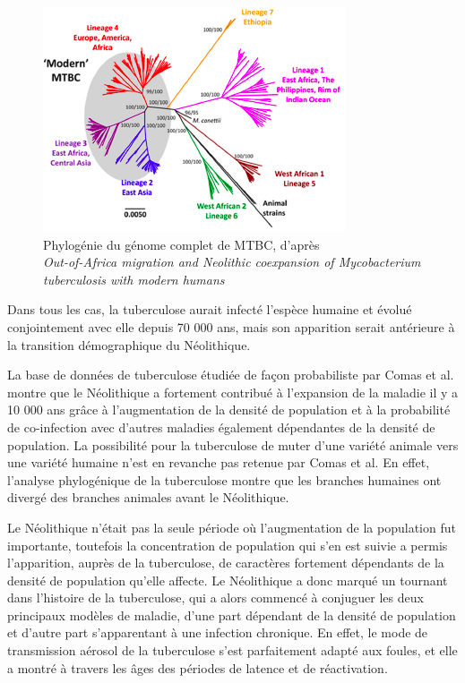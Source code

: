 \documentclass[twoside,a4paper,11pt,frenchb,openany]{report}
\begin{document}
\begin{figure}[h!]
\centering
\includegraphics[scale=0.7]{worldlignee.png}
\caption{Phylogénie du génome complet de MTBC, d'après\\ \textit{Out-of-Africa migration and Neolithic coexpansion of Mycobacterium\\tuberculosis with modern humans}}
\end{figure}


Dans tous les cas, la tuberculose aurait infecté l'espèce humaine et évolué conjointement avec elle depuis 70 000 ans, mais son apparition serait antérieure à la transition démographique du Néolithique.

La base de données de tuberculose étudiée de façon probabiliste par Comas et al.\cite{comas} montre que le Néolithique a fortement contribué à l'expansion de la maladie il y a 10 000 ans grâce à l'augmentation de la densité de population et à la probabilité de co-infection avec d'autres maladies également dépendantes de la densité de population. La possibilité pour la tuberculose de muter d'une variété animale vers une variété humaine n'est en revanche pas retenue par Comas et al. En effet, l'analyse phylogénique de la tuberculose montre que les branches humaines ont divergé des branches animales avant le Néolithique.

Le Néolithique n'était pas la seule période où l'augmentation de la population fut importante, toutefois la concentration de population qui s'en est suivie a permis l'apparition, auprès de la tuberculose, de caractères fortement dépendants de la densité de population qu'elle affecte. Le Néolithique a donc marqué un tournant dans l'histoire de la tuberculose, qui a alors commencé à conjuguer les deux principaux modèles de maladie, d'une part dépendant de la densité de population et d'autre part s'apparentant à une infection chronique. En effet, le mode de transmission aérosol de la tuberculose s'est parfaitement adapté aux foules, et elle a montré à travers les âges des périodes de latence et de réactivation.
\end{document}
